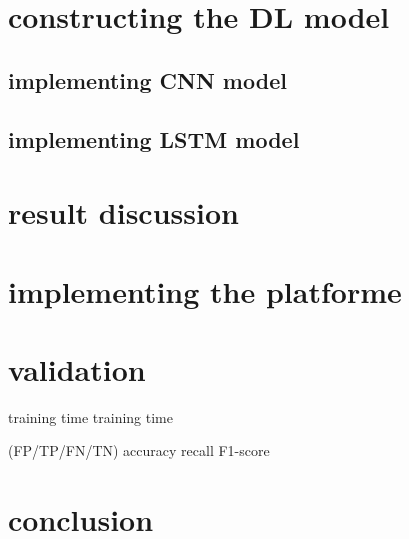 \section{constructing the DL model}
\subsection{implementing CNN model}
\subsection{implementing LSTM model}

\section{result discussion}
\section{implementing the platforme}
\section{validation}

training time
training time

(FP/TP/FN/TN)
accuracy
recall
F1-score























\section{conclusion}

